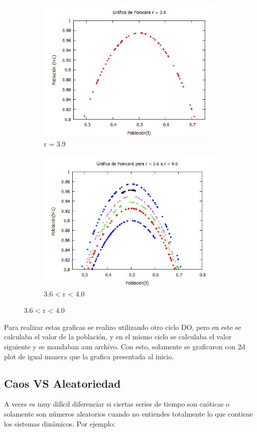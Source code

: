 \documentclass[12pt]{article}
\begin{document}
\begin{figure}[h!]
\begin{subfigure}{.6\textwidth}
  \centering
  \includegraphics[width=.8\linewidth]{Poi3.png}
  \caption{r = 3.9}
  \label{fig:sfig1}
\end{subfigure}
\begin{subfigure}{.6\textwidth}
  \centering
  \includegraphics[width=.8\linewidth]{Poi4.png}
  \caption{3.6 < r < 4.0 }
  \label{fig:sfig2}
\end{subfigure}
\end{figure}

Para realizar estas graficas se realizo utilizando otro ciclo DO, pero en este se calculaba el valor de la población, y en el mismo ciclo se calculaba el valor siguiente y se mandaban aun archivo. Con esto, solamente se graficaron con 2d plot de igual manera que la grafica presentada al inicio. 
\subsection{Caos VS Aleatoriedad}
A veces es muy difícil diferenciar si ciertas series de tiempo son caóticas o solamente son números aleatorios cuando no entiendes totalmente lo que contiene los sistemas dinámicos. Por ejemplo:
\end{document}
